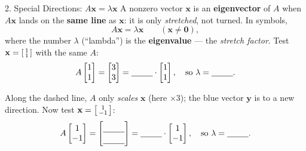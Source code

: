 \documentclass[10pt]{article}
\newcommand{\xx}{\mathbf{x}}
\newcommand{\yy}{\mathbf{y}}
\newcommand{\zero}{\mathbf{0}}
\begin{document}
\begin{notesbox}{2. Special Directions: $A\xx=\lambda\xx$}
A nonzero vector $\xx$ is an \textbf{eigenvector} of $A$ when $A\xx$ lands on the \textbf{same line}
as $\xx$: it is only \emph{stretched}, not turned. In symbols,
\[
  A\xx = \lambda\xx \qquad (\xx\ne\zero),
\]
where the number $\lambda$ (``lambda'') is the \textbf{eigenvalue} --- the \emph{stretch factor}.
Test $\xx=\begin{bsmallmatrix} 1\\ 1 \end{bsmallmatrix}$ with the same $A$:
\[
  A\begin{bmatrix} 1\\ 1 \end{bmatrix}
  = \begin{bmatrix} 3\\ 3 \end{bmatrix}
  = \blank{0.9cm}\cdot\begin{bmatrix} 1\\ 1 \end{bmatrix},
  \quad\text{so } \lambda = \blank{0.9cm}.
\]

\begin{center}
\end{center}
Along the dashed line, $A$ only \emph{scales} $\xx$ (here $\times3$); the blue vector $\yy$ is
\blank{2.0cm} to a new direction. Now test $\xx=\begin{bsmallmatrix} 1\\ -1 \end{bsmallmatrix}$:
\[
  A\begin{bmatrix} 1\\ -1 \end{bmatrix}
  = \begin{bmatrix}\rule{0pt}{1.1em}\blank{0.9cm}\\[2pt]\blank{0.9cm}\end{bmatrix}
  = \blank{0.9cm}\cdot\begin{bmatrix} 1\\ -1 \end{bmatrix},
  \quad\text{so } \lambda = \blank{0.9cm}.
\]
\end{notesbox}
\end{document}
